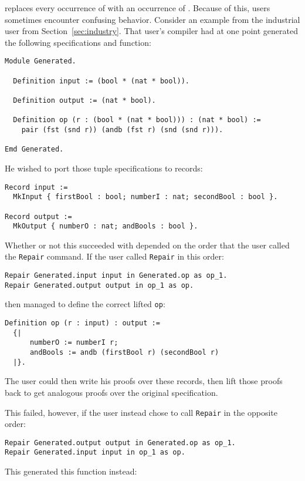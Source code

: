 \toolname replaces every occurrence of \A with an occurrence of \B.
Because of this, users sometimes encounter confusing behavior.
Consider an example from the industrial user from Section~\ref{sec:industry}.
That user's compiler had at one point generated the following specifications and function:

\begin{lstlisting}
Module Generated.

  Definition input := (bool * (nat * bool)).

  Definition output := (nat * bool).

  Definition op (r : (bool * (nat * bool))) : (nat * bool) :=
    pair (fst (snd r)) (andb (fst r) (snd (snd r))).

Emd Generated.
\end{lstlisting}
He wished to port those tuple specifications to records:

\begin{lstlisting}
Record input :=
  MkInput { firstBool : bool; numberI : nat; secondBool : bool }.

Record output :=
  MkOutput { numberO : nat; andBools : bool }.
\end{lstlisting}
Whether or not this succeeded with \toolname depended on the order that the user
called the \lstinline{Repair} command.
If the user called \lstinline{Repair} in this order:

\begin{lstlisting}
Repair Generated.input input in Generated.op as op_1.
Repair Generated.output output in op_1 as op.
\end{lstlisting}
then \toolname managed to define the correct lifted \lstinline{op}:

\begin{lstlisting}
Definition op (r : input) : output :=
  {|
      numberO := numberI r;
      andBools := andb (firstBool r) (secondBool r)
  |}.
\end{lstlisting}
The user could then write his proofs over these records,
then lift those proofs back to get analogous proofs over the original specification.

This failed, however, if the user instead chose to call \lstinline{Repair} in the opposite order:

\begin{lstlisting}
Repair Generated.output output in Generated.op as op_1.
Repair Generated.input input in op_1 as op.
\end{lstlisting}
This generated this function instead:


